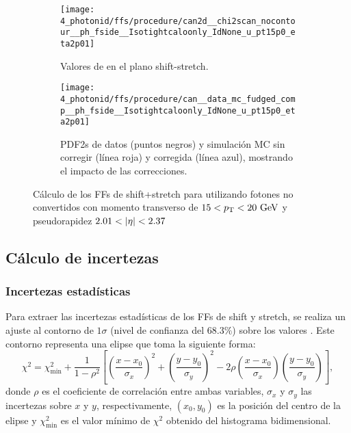 \begin{figure}[ht!]
    \centering
    \begin{subfigure}[t]{0.49\linewidth}
        \centering
        \texttt{[image: 4\_photonid/ffs/procedure/can2d\_\_chi2scan\_nocontour\_\_ph\_fside\_\_Isotightcaloonly\_IdNone\_u\_pt15p0\_eta2p01]}
        \caption{Valores de \chisq en el plano shift-stretch.}
        \label{fig:ss_corrections:ffs:calculation:fside_calculation:chi2}
    \end{subfigure}
    \hfill
    \begin{subfigure}[t]{0.49\linewidth}
        \centering
        \texttt{[image: 4\_photonid/ffs/procedure/can\_\_data\_mc\_fudged\_comp\_\_ph\_fside\_\_Isotightcaloonly\_IdNone\_u\_pt15p0\_eta2p01]}
        \caption{\acp{PDF2} de datos (puntos negros) y simulación \ac{MC} sin corregir (línea roja) y corregida (línea azul), mostrando el impacto de las correcciones.}
        \label{fig:ss_corrections:ffs:calculation:fside_calculation:pdfs}
    \end{subfigure}
    \caption{Cálculo de los \acp{FF} de shift+stretch para \fside utilizando fotones no convertidos con momento transverso de \(15<p_{\text{T}}<20~\text{GeV}\) y pseudorapidez \(2.01<\abseta<2.37\) }
    \label{fig:ss_corrections:ffs:calculation:fside_calculation}
\end{figure}







\subsection{Cálculo de incertezas}
\label{subsec:ss_corrections:ffs:uncs}

\subsubsection{Incertezas estadísticas}

Para extraer las incertezas estadísticas de los \acp{FF} de shift y stretch, se realiza un ajuste al contorno de \(1\sigma\) (nivel de confianza del \(68.3\%\)) sobre los valores \chisq. Este contorno representa una elipse que toma la siguiente forma:
\begin{equation}
    \chi^2 = \chi^2_{\text{min}} + \frac{1}{1-\rho^2} \left[ \left( \frac{x-x_0}{\sigma_x} \right)^2 + \left( \frac{y-y_0}{\sigma_y} \right)^2 - 2\rho \left( \frac{x-x_0}{\sigma_x} \right) \left( \frac{y-y_0}{\sigma_y} \right) \right],
\end{equation}
donde \(\rho\) es el coeficiente de correlación entre ambas variables, \(\sigma_x\) y \(\sigma_y\) las incertezas sobre \(x\) y \(y\), respectivamente, \((x_0, y_0)\) es la posición del centro de la elipse y \(\chi^2_{\text{min}}\) es el valor mínimo de \(\chi^2\) obtenido del histograma bidimensional.


